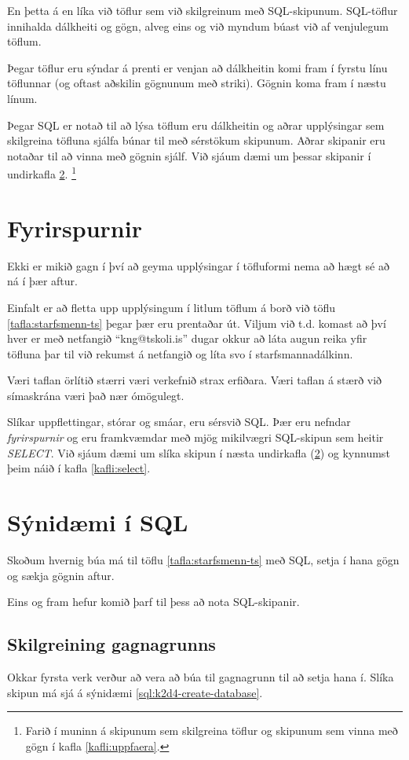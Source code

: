 En þetta á en líka við töflur sem við skilgreinum með SQL-skipunum. SQL-töflur innihalda dálkheiti og gögn, alveg eins og við myndum búast við af venjulegum töflum.

Þegar töflur eru sýndar á prenti er venjan að dálkheitin komi fram í fyrstu línu töflunnar (og oftast aðskilin gögnunum með striki). Gögnin koma fram í næstu línum.

Þegar SQL er notað til að lýsa töflum eru dálkheitin og aðrar upplýsingar sem skilgreina töfluna sjálfa búnar til með sérstökum skipunum. Aðrar skipanir eru notaðar til að vinna með gögnin sjálf. Við sjáum dæmi um þessar skipanir í undirkafla \ref{undirkafli:synidaemi-i-sql}. \footnote{Farið í muninn á skipunum sem skilgreina töflur og skipunum sem vinna með gögn í kafla \ref{kafli:uppfaera}.}
\section{Fyrirspurnir}
Ekki er mikið gagn í því að geyma upplýsingar í töfluformi nema að hægt sé að ná í þær aftur.

Einfalt er að fletta upp upplýsingum í litlum töflum á borð við töflu \ref{tafla:starfsmenn-ts} þegar þær eru prentaðar út. Viljum við t.d. komast að því hver er með netfangið ``kng@tskoli.is'' dugar okkur að láta augun reika yfir töfluna þar til við rekumst á netfangið og líta svo í starfsmannadálkinn.

Væri taflan örlítið stærri væri verkefnið strax erfiðara. Væri taflan á stærð við símaskrána væri það nær ómögulegt.

Slíkar uppflettingar, stórar og smáar, eru sérsvið SQL. Þær eru nefndar \emph{fyrirspurnir} og eru framkvæmdar með mjög mikilvægri SQL-skipun sem heitir \emph{SELECT}. Við sjáum dæmi um slíka skipun í næsta undirkafla (\ref{undirkafli:synidaemi-i-sql}) og kynnumst þeim náið í kafla \ref{kafli:select}.

\section{Sýnidæmi í SQL}
\label{undirkafli:synidaemi-i-sql}
Skoðum hvernig búa má til töflu \ref{tafla:starfsmenn-ts} með SQL, setja í hana gögn og sækja gögnin aftur. 

Eins og fram hefur komið þarf til þess að nota SQL-skipanir. 

\subsection{Skilgreining gagnagrunns}
Okkar fyrsta verk verður að vera að búa til gagnagrunn til að setja hana í. Slíka skipun má sjá á sýnidæmi \ref{sql:k2d4-create-database}.

